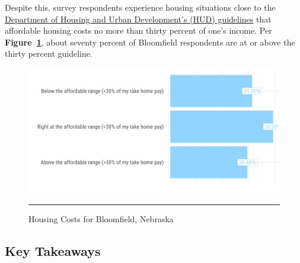 \pagebreak
\noindent Despite this, survey respondents experience housing situations close to the \href{https://www.hudexchange.info/programs/home/home-income-limits}{Department of Housing and Urban Development's (HUD) guidelines} that affordable housing costs no more than thirty percent of one's income. Per \textbf{Figure~\ref{fig:housingCostsSurvey}}, about seventy percent of Bloomfield respondents are at or above the thirty percent guideline.

\begin{figure}[H]
\centering
\begin{framed}
    \caption{Housing Costs for Bloomfield, Nebraska}
    \label{fig:housingCostsSurvey}
    \includegraphics[width=\linewidth]{figures/survey_respondent_housing_costs.png}
    \rule[-5pt]{\linewidth}{0.4pt}
\end{framed}
\end{figure}

\pagebreak
\subsection*{Key Takeaways}